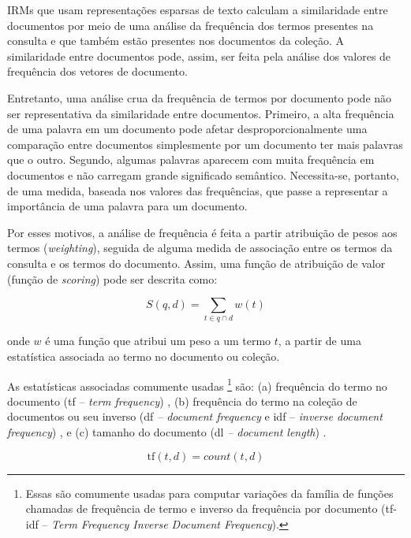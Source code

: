 \documentclass[
	12pt,				%
	openright,			%
	oneside,			%
	a4paper,			%
	english,			%
	french,				%
	spanish,			%
	brazil				%
	]{abntex2}
\begin{document}
IRMs que usam representações esparsas de texto calculam a similaridade entre documentos por meio de uma análise da frequência dos termos presentes na consulta e que também estão presentes nos documentos da coleção.
A similaridade entre documentos pode, assim, ser feita pela análise dos valores de frequência dos vetores de documento.

Entretanto, uma análise crua da frequência de termos por documento pode não ser representativa da similaridade entre documentos.
Primeiro, a alta frequência de uma palavra em um documento pode afetar desproporcionalmente uma comparação entre documentos simplesmente por um documento ter mais palavras que o outro.
Segundo, algumas palavras aparecem com muita frequência em documentos e não
carregam grande significado semântico.
Necessita-se, portanto, de uma medida, baseada nos valores das frequências, que passe a representar
a importância de uma palavra para um documento.

Por esses motivos, a análise de frequência é feita a partir atribuição de pesos aos termos (\textit{weighting}), seguida de alguma medida de associação entre os termos da consulta e os termos do documento.
Assim, uma função de atribuição de valor (função de \textit{scoring}) pode ser descrita como:

\begin{equation}
\label{eq:score}
    S(q,d) = \sum_{t \in q \cap d} w(t)
\end{equation}

onde $w$ é uma função que atribui um peso a um termo $t$, a partir de uma estatística associada ao termo no documento ou coleção.

As estatísticas associadas comumente usadas
\footnote{Essas são comumente usadas para computar variações da família de funções chamadas de frequência de termo e inverso da frequência por documento (tf-idf -- \textit{Term Frequency Inverse Document Frequency}).}
são:
(a) frequência do termo no documento (tf -- \textit{term frequency})
, (b) frequência do termo na coleção de documentos ou seu inverso (df \textit{-- document frequency} e idf { -- \textit{inverse document frequency}})
, e (c) tamanho do documento (dl \textit{-- document length})
 \cite{biblia}.

\begin{equation}
\text{tf}(t, d) = count(t, d)
\label{eq:tf}
\end{equation}
\end{document}
